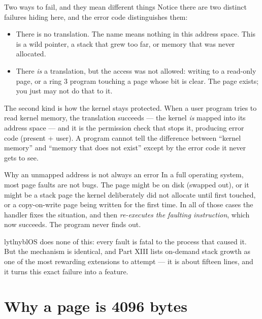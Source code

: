 \begin{concept}{Two ways to fail, and they mean different things}
Notice there are two distinct failures hiding here, and the error code distinguishes them:

\begin{itemize}
  \item {} There is no translation. The name means nothing in
        this address space. This is a wild pointer, a stack that grew too far, or memory that was
        never allocated.
  \item {} There \emph{is} a translation, but the access
        was not allowed: writing to a read-only page, or a ring 3 program touching a page whose
         bit is clear. The page exists; you just may not do that to it.
\end{itemize}

The second kind is how the kernel stays protected. When a user program tries to read kernel memory,
the translation succeeds --- the kernel \emph{is} mapped into its address space --- and it is the
permission check that stops it, producing error code  (present + user). A program cannot
tell the difference between ``kernel memory'' and ``memory that does not exist'' except by the error
code it never gets to see.
\end{concept}

\begin{warn}{Why an unmapped address is not always an error}
In a full operating system, most page faults are not bugs. The page might be on disk (swapped out),
or it might be a stack page the kernel deliberately did not allocate until first touched, or a
copy-on-write page being written for the first time. In all of those cases the handler fixes the
situation, and then \emph{re-executes the faulting instruction}, which now succeeds. The program
never finds out.

lytlnyblOS does none of this: every fault is fatal to the process that caused it. But the mechanism
is identical, and Part XIII lists on-demand stack growth as one of the most rewarding extensions to
attempt --- it is about fifteen lines, and it turns this exact failure into a feature.
\end{warn}

\section{Why a page is 4096 bytes}

